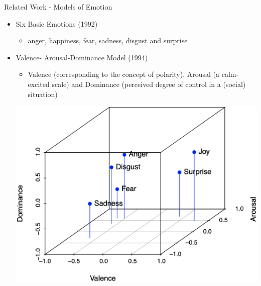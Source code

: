 \documentclass[
 size=14pt,
 paper=smartboard,  %
 mode=present, 		%
 display=slides, 	%
 style=tuliplab,  	%
 pauseslide,
 fleqn,leqno]{powerdot}
\begin{document}
\begin{slide}{Related Work - Models of Emotion}


\begin{itemize}
\item
Six Basic Emotions (1992)

\begin{itemize}
\item
anger, happiness, fear, sadness, disgust and surprise
\end{itemize}

\item 
Valence- Arousal-Dominance Model (1994)

\begin{itemize}
	\item 
	Valence (corresponding to the concept of polarity),
	Arousal (a calm-excited scale) and
	Dominance (perceived degree of control in a (social) situation)
\end{itemize}
\begin{center}
\includegraphics[width=.4\linewidth]{figures/six_emotions_vad.eps}
\end{center}
\end{itemize}


\end{slide}
\end{document}
